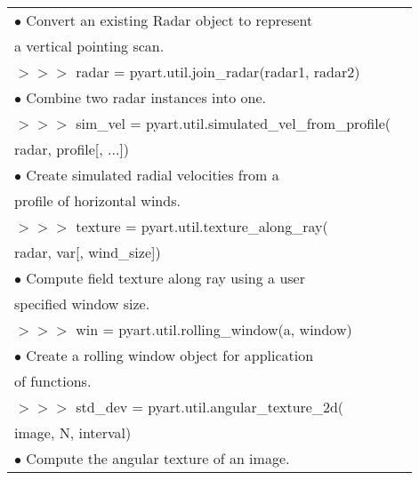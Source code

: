 \documentclass[potrait, z1paper, fontscale=0.33]{baposter} %
\begin{document}
\begin{poster}
{\begin{flushleft}
\begin{tabular}{@{}ll@{}}
\-\hspace{0.4cm} $\bullet$ Convert an existing Radar object to represent\\
\-\hspace{0.7cm} a vertical pointing scan.\\
$>$$>$$>$ radar = pyart.util.join\_radar(radar1, radar2)\\
\-\hspace{0.4cm} $\bullet$ Combine two radar instances into one.\\
$>$$>$$>$ sim\_vel = pyart.util.simulated\_vel\_from\_profile(\\
\-\hspace{1.5cm} radar, profile[, ...])\\
\-\hspace{0.4cm} $\bullet$ Create simulated radial velocities from a\\
\-\hspace{0.7cm} profile of horizontal winds.\\
$>$$>$$>$ texture = pyart.util.texture\_along\_ray(\\
\-\hspace{1.5cm} radar, var[, wind\_size])\\
\-\hspace{0.4cm} $\bullet$ Compute field texture along ray using a user\\
\-\hspace{0.7cm} specified window size.\\
$>$$>$$>$ win = pyart.util.rolling\_window(a, window)\\
\-\hspace{0.4cm} $\bullet$ Create a rolling window object for application\\
\-\hspace{0.7cm}  of functions.\\
$>$$>$$>$ std\_dev = pyart.util.angular\_texture\_2d(\\
\-\hspace{1.5cm} image, N, interval)\\
\-\hspace{0.4cm} $\bullet$ Compute the angular texture of an image.\\

\end{tabular}
\end{flushleft}

}



\end{poster}
\end{document}
